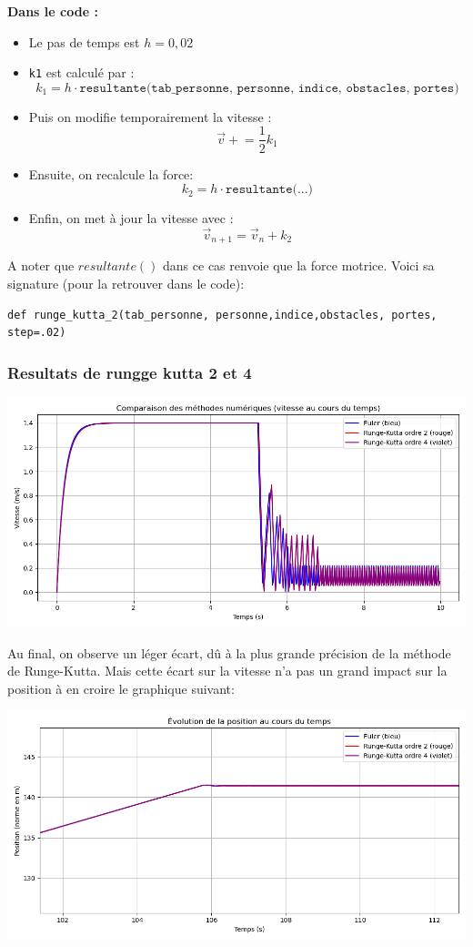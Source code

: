 \documentclass[a4paper,12pt]{article}
\begin{document}
\textbf{Dans le code :}
\begin{itemize}
    \item Le pas de temps est $h = 0{,}02$
    \item \texttt{k1} est calculé par :
    \[
    k_1 = h \cdot \texttt{resultante(tab\_personne, personne, indice, obstacles, portes)}
    \]
    \item Puis on modifie temporairement la vitesse :
    \[
    \vec{v} \mathrel{+}= \frac{1}{2} k_1
    \]
    \item Ensuite, on recalcule la force:
    \[
    k_2 = h \cdot \texttt{resultante(...)}
    \]
    \item Enfin, on met à jour la vitesse avec :
    \[
    \vec{v}_{n+1} = \vec{v}_n + k_2
    \]
\end{itemize}
\hspace{1em}
A noter que $resultante()$ dans ce cas renvoie que la force motrice. Voici sa signature (pour la retrouver dans le code):
\begin{verbatim}
def runge_kutta_2(tab_personne, personne,indice,obstacles, portes, step=.02)
\end{verbatim}
\subsubsection{Resultats de rungge kutta 2 et 4}

\includegraphics[width=\textwidth]{runge.png}

Au final, on observe un léger écart, dû à la plus grande précision de la méthode de Runge-Kutta. Mais cette écart sur la vitesse n'a pas un grand impact sur la position à en croire le graphique suivant:

\includegraphics[width=\textwidth]{runge_pos.png}
\end{document}
